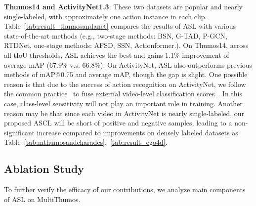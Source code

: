 \documentclass[10pt,twocolumn,letterpaper]{article}
\begin{document}
\textbf{Thumos14 and ActivityNet1.3}:
These two datasets are popular and nearly single-labeled, with approximately one action instance in each clip. Table~\ref{tab:result_thumosandanet} compares the results of ASL with various state-of-the-art methods (e.g., two-stage methods: BSN\cite{BSN2018arXiv}, G-TAD\cite{xu2020gtad}, P-GCN\cite{PGCN2019ICCV}, RTDNet\cite{rtdnet}, one-stage methods: AFSD\cite{afsd}, SSN\cite{SSN2017ICCV}, Actionformer\cite{zhang2022actionformer}.). On Thumos14, across all tIoU thresholds, ASL achieves the best and gains 1.1\% improvement of average mAP (67.9\% v.s. 66.8\%). On ActivityNet, ASL also outperforms previous methods of mAP@0.75 and average mAP, though the gap is slight. One possible reason is that due to the success of action recognition on ActivityNet, we follow the common practice~\cite{zhang2022actionformer,vsgn,contextloc} to fuse external video-level classification scores~\cite{cuhkanet}. In this case, class-level sensitivity will not play an important role in training. Another reason may be that since each video in ActivityNet is nearly single-labeled, our proposed ASCL will be short of positive and negative samples, leading to a non-significant increase compared to improvements on densely labeled datasets as Table~\ref{tab:mthumosandcharades},~\ref{tab:result_ego4d}.


\subsection{Ablation Study}


\label{sec:ablation} To further verify the efficacy of our contributions, we analyze main components of ASL on MultiThumos.
\end{document}
